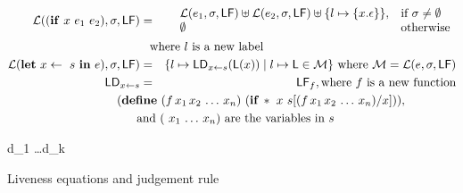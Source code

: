 \documentclass{sig-alternate}
\begin{document}
\begin{figure*}[t]
\begin{eqnarray*}
\mathcal{L}((\SIF~x~e_1~e_2),\sigma,\Lfonly) &=&
        \begin{array}{l l}
                    \mathcal{L}(e_1,\sigma,\Lfonly) \uplus
        \mathcal{L}(e_2,\sigma,\Lfonly) \uplus
        \{l \mapsto  \{x.\epsilon\}\},  & \mbox{if}~\sigma \ne \emptyset\\
        \emptyset  & \mbox{otherwise}
                 \end{array} \\
 \makebox[0mm]{\hspace*{3.8cm} where $l$ is a new label}\\
\mathcal{L}(\LET~x \leftarrow~s~\IN~e),\sigma,\Lfonly) &=&
        \{ l \mapsto \Ldonly_{x \leftarrow s}(\Lv(x)) \mid l \mapsto \Lv
        \in \mathcal{M}\}
\mbox{ where } \mathcal{M} = \mathcal{L}(e,\sigma,\Lfonly)\\
\Ldonly_{x \leftarrow s} &=& \Lfonly_f, \mbox{where}~f~\mbox{is a new function}\\
 \makebox[0mm]{\hspace*{7cm}   
 $(\DEFINE~(f\,x_1\,x_2\, \ldots \, x_n)~(\SIF\,*~x~s[(f\,x_1\,
           x_2\, \ldots\, x_n)/x]))$,} \\
 \makebox[0mm]{\hspace*{5.5cm} and 
     $(\ x_1\, \ldots\, x_n)$ are the variables in $s$}
\end{eqnarray*}
\begin{minipage}{0.85\textwidth}
        { d_1 \ldots d_k \len \Lfonly
\\ }
\end{minipage}
  \caption{Liveness equations and judgement rule}\label{fig:live-judge}
\end{figure*}
\end{document}
